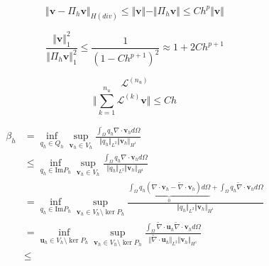 \begin{equation}
    \Vert \boldsymbol v - \Pi_h \boldsymbol v \Vert_{H(div)} \le \Vert \boldsymbol v \Vert - \Vert \Pi_h \boldsymbol v \Vert \le Ch^{p}\Vert \boldsymbol v \Vert
\end{equation}

\begin{equation}
\frac{\Vert \boldsymbol v \Vert_1^2}{\Vert \Pi_h \boldsymbol v \Vert_1^2} \le \frac{1}{(1-Ch^{p+1})^2} \approx 1 + 2Ch^{p+1}
\end{equation}

\begin{equation}
    \mathcal L^{(n_u)}
\end{equation}
\begin{equation}
    \Vert \sum_{k=1}^{n_u} \mathcal L^{(k)} \boldsymbol v \Vert \le C h
\end{equation}


\begin{equation}
\begin{split}
\beta_h &= \inf_{q_h \in Q_h} \sup_{\boldsymbol v_h \in V_h} \frac{\int_{\Omega} q_h \nabla \cdot \boldsymbol v_h d\Omega}{\Vert q_h \Vert_{L^2} \Vert \boldsymbol v_h \Vert_{H^1}} \\
    &\le \inf_{q_h \in \textrm{Im} P_h} \sup_{\boldsymbol v_h \in V_h} \frac{\int_{\Omega} q_h \nabla \cdot \boldsymbol v_h d\Omega}{\Vert q_h \Vert_{L^2} \Vert \boldsymbol v_h \Vert_{H^1}} \\
    &= \inf_{q_h \in \textrm{Im} P_h} \sup_{\boldsymbol v_h \in V_h\setminus \ker P_h} \frac{\underbrace{\int_{\Omega} q_h (\nabla \cdot \boldsymbol v_h - \tilde{\nabla} \cdot \boldsymbol v_h) d\Omega}_{0} + \int_\Omega q_h \tilde{\nabla} \cdot \boldsymbol v_h d\Omega}{\Vert q_h \Vert_{L^2} \Vert \boldsymbol v_h \Vert_{H^1}} \\
    &= \inf_{\boldsymbol u_h \in V_h\setminus \ker P_h} \sup_{\boldsymbol v_h \in V_h\setminus \ker P_h} \frac{\int_{\Omega} \tilde \nabla \cdot \boldsymbol u_h \tilde \nabla \cdot \boldsymbol v_h d\Omega}{\Vert \tilde \nabla \cdot \boldsymbol u_h \Vert_{L^2} \Vert \boldsymbol v_h \Vert_{H^1}} \\
    &\le
\end{split}
\end{equation}

